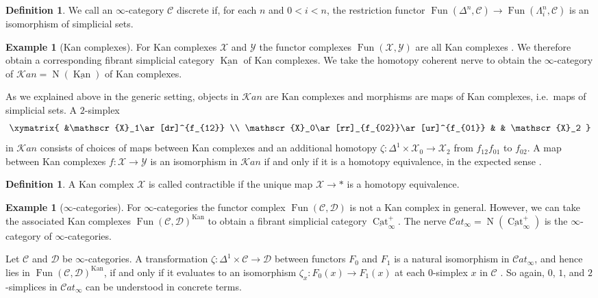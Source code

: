\documentclass[reqno]{amsart}
\theoremstyle{definition}
\newtheorem{example}[lemma]{Example}
\newtheorem{definition}[lemma]{Definition}
\newcommand{\msc}[1]{\mathscr{#1}}
\newcommand{\opn}[1]{\operatorname{#1}}
\newcommand{\sCat}{\msc{C}\!at}
\DeclareMathOperator{\Fun}{Fun}
\renewcommand{\1}{\mathbf{1}}
\begin{document}
\begin{definition}
We call an $\infty$-category $\msc{C}$ discrete if, for each $n$ and $0<i<n$, the restriction functor $\Fun(\Delta^n,\msc{C})\to \Fun(\Lambda^n_i,\msc{C})$ is an isomorphism of simplicial sets.
\end{definition}

\begin{example}[Kan complexes]
For Kan complexes $\msc{X}$ and $\msc{Y}$ the functor complexes $\Fun(\msc{X},\msc{Y})$ are all Kan complexes \cite[\href{https://kerodon.net/tag/00TN}{00TN}]{kerodon}. We therefore obtain a corresponding fibrant simplicial category $\underline{\opn{Kan}}$ of Kan complexes. We take the homotopy coherent nerve to obtain the $\infty$-category of $\msc{K}\!an=\opn{N}(\underline{\opn{Kan}})$ of Kan complexes.
\end{example}

As we explained above in the generic setting, objects in $\msc{K}\!an$ are Kan complexes and morphisms are maps of Kan complexes, i.e.\ maps of simplicial sets.  A $2$-simplex
\[
\xymatrix{
	&\msc{X}_1\ar[dr]^{f_{12}} \\
\msc{X}_0\ar[rr]_{f_{02}}\ar[ur]^{f_{01}} & & \msc{X}_2
}
\]
in $\msc{K}\!an$ consists of choices of maps between Kan complexes and an additional homotopy $\zeta:\Delta^1\times \msc{X}_0\to \msc{X}_2$ from $f_{12}f_{01}$ to $f_{02}$. A map between Kan complexes $f:\msc{X}\to\msc{Y}$ is an isomorphism in $\msc{K}\!an$ if and only if it is a homotopy equivalence, in the expected sense \cite[\href{https://kerodon.net/tag/00U1}{00U1}]{kerodon}.

\begin{definition}
A Kan complex $\msc{X}$ is called contractible if the unique map $\msc{X}\to \ast$ is a homotopy equivalence.
\end{definition}

\begin{example}[$\infty$-categories]
For $\infty$-categories the functor complex $\Fun(\msc{C},\msc{D})$ is not a Kan complex in general. However, we can take the associated Kan complexes $\Fun(\msc{C},\msc{D})^{\opn{Kan}}$ to obtain a fibrant simplicial category $\underline{\opn{Cat}}_{\infty}^+$.  The nerve $\msc{C}\!at_{\infty}=\opn{N}(\underline{\opn{Cat}}^+_{\infty})$ is the $\infty$-category of $\infty$-categories.
\end{example}

Let $\msc{C}$ and $\msc{D}$ be $\infty$-categories. A transformation $\zeta:\Delta^1\times \msc{C}\to \msc{D}$ between functors $F_0$ and $F_1$ is a natural isomorphism in $\msc{C}\!at_{\infty}$, and hence lies in $\Fun(\msc{C},\msc{D})^{\opn{Kan}}$, if and only if it evaluates to an isomorphism $\zeta_x:F_0(x)\to F_1(x)$ at each $0$-simplex $x$ in $\msc{C}$ \cite[\href{https://kerodon.net/tag/01DK}{01DK}]{kerodon}.  So again, $0$, $1$, and $2$-simplices in $\sCat_{\infty}$ can be understood in concrete terms.  
\end{document}
